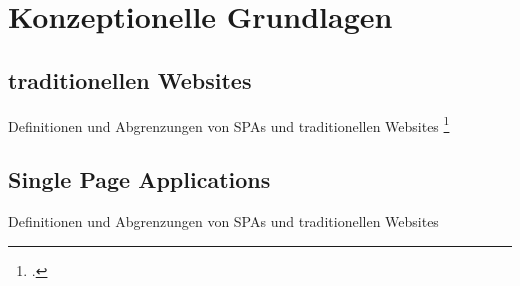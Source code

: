 \section{Konzeptionelle Grundlagen}
\subsection{traditionellen Websites}
Definitionen und Abgrenzungen von SPAs und traditionellen Websites
\footcite[Vgl. ][Seite 1]{Scott2015}
\subsection{Single Page Applications}
Definitionen und Abgrenzungen von SPAs und traditionellen Websites
